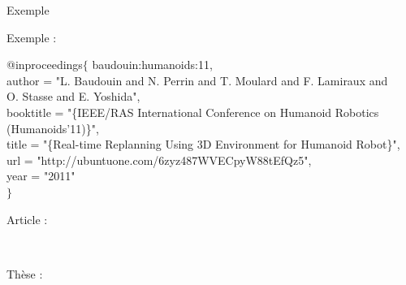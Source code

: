 \documentclass{beamer}
\begin{document}
\begin{frame}{Exemple}

  Exemple :\\
  \vspace{2mm}
  \begin{scriptsize}
    @inproceedings$\lbrace$ baudouin\string:humanoids\string:11,\\
    \hspace{5mm} author = "L. Baudouin and N. Perrin and T. Moulard and F. Lamiraux and\\
    \hspace{19mm} O. Stasse and E. Yoshida",\\
    \hspace{5mm} booktitle = "\{IEEE/RAS International Conference on Humanoid Robotics\\
    \hspace{22mm} (Humanoids'11)\}",\\
    \hspace{5mm} title = "\{Real-time Replanning Using 3D Environment for Humanoid Robot\}",\\
    \hspace{5mm} url = "http://ubuntuone.com/6zyz487WVECpyW88tEfQz5",\\
    \hspace{5mm} year = "2011"\\
    \vspace{-2mm}
    $\rbrace$
  \end{scriptsize}
  \vspace{5mm}

  Article :\\
  \begin{scriptsize}
    \mbox{
      \citeauthor{baudouin:humanoids:11}
      \cite{baudouin:humanoids:11}
    }
  \end{scriptsize}

  Thèse :\\
  \begin{scriptsize}
    \mbox{
      \citeauthor{Courbon09PhD}
      \cite{Courbon09PhD}}
  \end{scriptsize}
  \vspace{5mm}

\end{frame}
\end{document}
